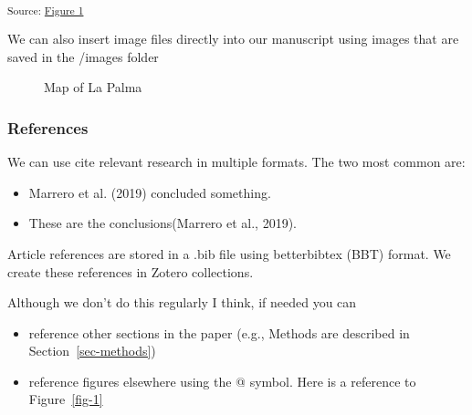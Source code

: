\documentclass[
]{agujournal2019}
\providecommand{\tightlist}{%
  \setlength{\itemsep}{0pt}\setlength{\parskip}{0pt}}\usepackage{longtable,booktabs,array}
\begin{document}
\textsubscript{Source:
\href{https://seschneck.github.io/study_test/notebooks/fig1-preview.html\#cell-fig-1}{Figure
1}}

We can also insert image files directly into our manuscript using images
that are saved in the /images folder

\begin{figure}


\caption{\label{fig-map}Map of La Palma}

\end{figure}%

\subsubsection{References}\label{references}

We can use cite relevant research in multiple formats. The two most
common are:

\begin{itemize}
\tightlist
\item
  Marrero et al. (2019) concluded something.\\
\item
  These are the conclusions(Marrero et al., 2019).
\end{itemize}

Article references are stored in a .bib file using betterbibtex (BBT)
format. We create these references in Zotero collections.

Although we don't do this regularly I think, if needed you can

\begin{itemize}
\tightlist
\item
  reference other sections in the paper (e.g., Methods are described in
  Section~\ref{sec-methods})
\item
  reference figures elsewhere using the @ symbol. Here is a reference to
  Figure~\ref{fig-1}
\end{itemize}
\end{document}
